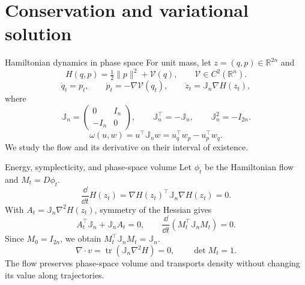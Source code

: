\section[Structural applications]{Conservation and variational solution}

\begin{frame}[t]{Hamiltonian dynamics in phase space}
\hypertarget{main:hamiltonian}{}
For unit mass, let $z=(q,p)\in\mathbb R^{2n}$ and
\begin{equation*}
  H(q,p)=\tfrac12\|p\|^2+\mathcal V(q),\qquad \mathcal V\in C^2(\mathbb R^n).
\end{equation*}
\begin{equation*}
  \dot q_t=p_t,\qquad \dot p_t=-\nabla\mathcal V(q_t),\qquad
  \dot z_t=\mathbb J_n\nabla H(z_t),
\end{equation*}
where
\begin{equation*}
  \mathbb J_n=\begin{pmatrix}0&I_n\\-I_n&0\end{pmatrix},\qquad
  \mathbb J_n^\top=-\mathbb J_n,\qquad \mathbb J_n^2=-I_{2n}.
\end{equation*}
\begin{equation*}
  \omega(u,w)=u^\top\mathbb J_nw=u_q^\top w_p-u_p^\top w_q.
\end{equation*}
We study the flow and its derivative on their interval of existence.
\end{frame}

\begin{frame}[t]{Energy, symplecticity, and phase-space volume}
\hypertarget{main:ham-conservation}{}
Let $\phi_t$ be the Hamiltonian flow and $M_t=D\phi_t$.
\begin{equation*}
  \frac{\dd}{\dd t}H(z_t)=\nabla H(z_t)^\top\mathbb J_n\nabla H(z_t)=0.
\end{equation*}
With $A_t=\mathbb J_n\nabla^2H(z_t)$, symmetry of the Hessian gives
\begin{equation*}
  A_t^\top\mathbb J_n+\mathbb J_nA_t=0,\qquad
  \frac{\dd}{\dd t}(M_t^\top\mathbb J_nM_t)=0.
\end{equation*}
Since $M_0=I_{2n}$, we obtain $M_t^\top\mathbb J_nM_t=\mathbb J_n$.
\begin{equation*}
  \nabla\cdot v=\operatorname{tr}(\mathbb J_n\nabla^2H)=0,
  \qquad \det M_t=1.
\end{equation*}
The flow preserves phase-space volume and transports density without changing its value along trajectories.
\end{frame}

